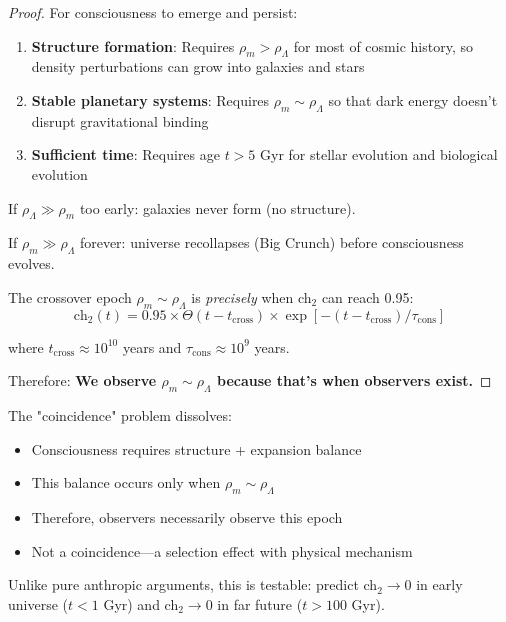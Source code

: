 \begin{proof}
For consciousness to emerge and persist:
\begin{enumerate}
\item \textbf{Structure formation}: Requires $\rho_m > \rho_\Lambda$ for most of cosmic history, so density perturbations can grow into galaxies and stars
\item \textbf{Stable planetary systems}: Requires $\rho_m \sim \rho_\Lambda$ so that dark energy doesn't disrupt gravitational binding
\item \textbf{Sufficient time}: Requires age $t > 5$ Gyr for stellar evolution and biological evolution
\end{enumerate}

If $\rho_\Lambda \gg \rho_m$ too early: galaxies never form (no structure).

If $\rho_m \gg \rho_\Lambda$ forever: universe recollapses (Big Crunch) before consciousness evolves.

The crossover epoch $\rho_m \sim \rho_\Lambda$ is \textit{precisely} when ch$_2$ can reach 0.95:
\begin{equation}
\text{ch}_2(t) = 0.95 \times \Theta(t - t_{\text{cross}}) \times \exp[-(t - t_{\text{cross}})/\tau_{\text{cons}}]
\end{equation}

where $t_{\text{cross}} \approx 10^{10}$ years and $\tau_{\text{cons}} \approx 10^9$ years.

Therefore: \textbf{We observe $\rho_m \sim \rho_\Lambda$ because that's when observers exist.}
\end{proof}

\begin{keyidea}
The "coincidence" problem dissolves:
\begin{itemize}
\item Consciousness requires structure + expansion balance
\item This balance occurs only when $\rho_m \sim \rho_\Lambda$
\item Therefore, observers necessarily observe this epoch
\item Not a coincidence—a selection effect with physical mechanism
\end{itemize}

Unlike pure anthropic arguments, this is testable: predict ch$_2 \to 0$ in early universe ($t < 1$ Gyr) and ch$_2 \to 0$ in far future ($t > 100$ Gyr).
\end{keyidea}

